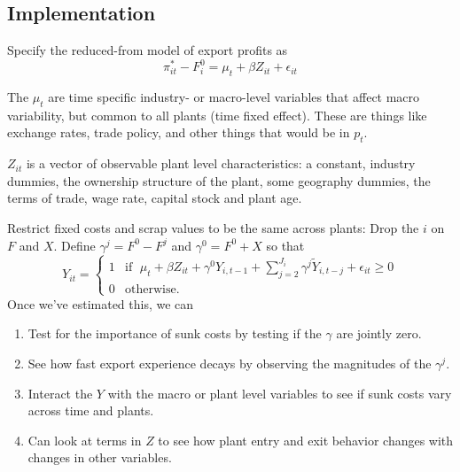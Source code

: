 \documentclass[11pt, pdftex]{article}
\begin{document}
\subsection*{Implementation}
Specify the reduced-from model of export profits as
\begin{equation}
    \pi^*_{it} -F^0_i = \mu_t +\beta Z_{it} +\epsilon_{it}
\end{equation}

 The $\mu_t$ are time specific industry- or macro-level variables that affect macro variability, but common to all plants (time fixed effect).  These are things like exchange rates, trade policy, and other things that would be in  $p_t$.

  $Z_{it}$ is a vector of observable plant level characteristics: a constant, industry dummies, the ownership structure of the plant, some geography dummies, the terms of trade, wage rate, capital stock and plant age.

Restrict fixed costs and scrap values to be the same across plants: Drop the $i$ on $F$ and $X$. Define $\gamma^j=F^0-F^j$ and $\gamma^0=F^0+X$ so that
\begin{equation} \label{eq:est1}
    Y_{it} = \begin{cases}
      1  &\mbox{if  }\; \mu_t + \beta Z_{it} +\gamma^0Y_{i,t-1} +\sum_{j=2}^{J_i}\gamma^j\widetilde{Y}_{i,t-j} +\epsilon_{it} \geq 0 \\
      0 &\mbox{otherwise}.
    \end{cases}
\end{equation}
Once we've estimated this, we can
\begin{enumerate}
  \item Test for the importance of sunk costs by testing if the $\gamma$ are jointly zero.
  \item See how fast export experience decays by observing the magnitudes of the $\gamma^j$.
  \item Interact the $Y$  with the macro or plant level variables to see if sunk costs vary across time and plants.

  \item Can look at terms in $Z$ to see how plant entry and exit behavior changes with changes in other variables.
\end{enumerate}
\end{document}
